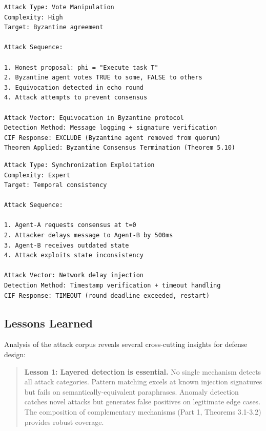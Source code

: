 \documentclass[
]{article}
\begin{document}
\begin{example}
\label{ex:consensus-poisoning}
\begin{verbatim}
Attack Type: Vote Manipulation
Complexity: High
Target: Byzantine agreement

Attack Sequence:

1. Honest proposal: phi = "Execute task T"
2. Byzantine agent votes TRUE to some, FALSE to others
3. Equivocation detected in echo round
4. Attack attempts to prevent consensus

Attack Vector: Equivocation in Byzantine protocol
Detection Method: Message logging + signature verification
CIF Response: EXCLUDE (Byzantine agent removed from quorum)
Theorem Applied: Byzantine Consensus Termination (Theorem 5.10)
\end{verbatim}
\end{example}

\begin{example}
\label{ex:timing-attack}
\begin{verbatim}
Attack Type: Synchronization Exploitation
Complexity: Expert
Target: Temporal consistency

Attack Sequence:

1. Agent-A requests consensus at t=0
2. Attacker delays message to Agent-B by 500ms
3. Agent-B receives outdated state
4. Attack exploits state inconsistency

Attack Vector: Network delay injection
Detection Method: Timestamp verification + timeout handling
CIF Response: TIMEOUT (round deadline exceeded, restart)
\end{verbatim}
\end{example}

\subsection{Lessons Learned}\label{sec:lessons-learned}

Analysis of the attack corpus reveals several cross-cutting insights for
defense design:

\begin{quote}
\textbf{Lesson 1: Layered detection is essential.} No single mechanism
detects all attack categories. Pattern matching excels at known
injection signatures but fails on semantically-equivalent paraphrases.
Anomaly detection catches novel attacks but generates false positives on
legitimate edge cases. The composition of complementary mechanisms (Part
1, Theorems 3.1-3.2) provides robust coverage.
\end{quote}
\end{document}

